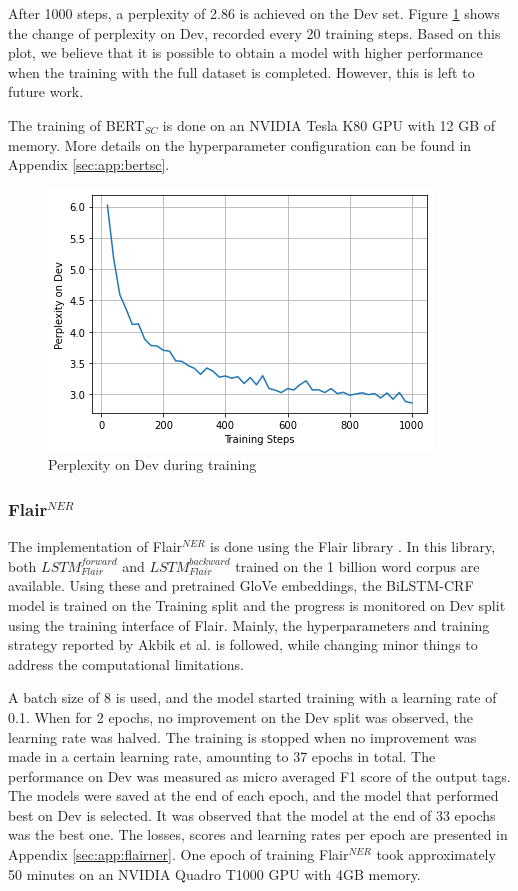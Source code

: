 \documentclass{report}
\theoremstyle{definition}
\theoremstyle{remark}
\begin{document}
After 1000 steps, a perplexity of 2.86 is achieved on the Dev set. Figure \ref{fig:perp} shows the change of perplexity on Dev, recorded every 20 training steps. Based on this plot, we believe that it is possible to obtain a model with higher performance when the training with the full dataset is completed. However, this is left to future work.

The training of BERT$_{SC}$ is done on an NVIDIA Tesla K80 GPU with 12 GB of memory. More details on the hyperparameter configuration can be found in Appendix \ref{sec:app:bertsc}.

\begin{figure}
    \centering
    \includegraphics[scale=0.7]{perpplot.png}
    \caption{Perplexity on Dev during training}
    \label{fig:perp}
\end{figure}

\subsubsection{Flair$^{NER}$}
The implementation of Flair$^{NER}$ is done using the Flair library \cite{flairlib}. In this library, both $LSTM^{forward}_{Flair}$ and $LSTM^{backward}_{Flair}$ trained on the 1 billion word corpus \cite{onebillion} are available. Using these and pretrained GloVe embeddings, the BiLSTM-CRF model is trained on the Training split and the progress is monitored on Dev split using the training interface of Flair.  Mainly, the hyperparameters and training strategy reported by Akbik et al. \cite{flairpaper} is followed, while changing minor things to address the computational limitations. 

A batch size of 8 is used, and the model started training with a learning rate of 0.1. When for 2 epochs, no improvement on the Dev split was observed, the learning rate was halved. The training is stopped when no improvement was made in a certain learning rate, amounting to 37 epochs in total. The performance on Dev was measured as micro averaged F1 score of the output tags. The models were saved at the end of each epoch, and the model that performed best on Dev is selected. It was observed that the model at the end of 33 epochs was the best one. The losses, scores and learning rates per epoch are presented in Appendix \ref{sec:app:flairner}. One epoch of training Flair$^{NER}$ took approximately 50 minutes on an NVIDIA Quadro T1000 GPU with 4GB memory. 
\end{document}

